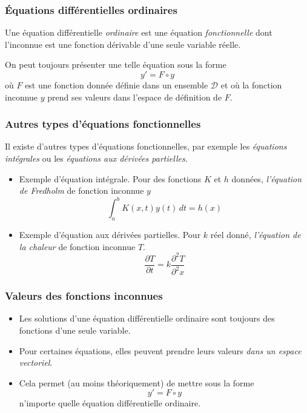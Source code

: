 
\lstset{language=Python,frame=single}

\begin{frame}
  \frametitle{\'Equations différentielles ordinaires}
Une équation différentielle \emph{ordinaire} est une équation \emph{fonctionnelle} dont l'inconnue est une fonction dérivable d'une seule variable réelle.

On peut toujours présenter une telle équation sous la forme
\begin{equation}
  y' = F\circ y
  \label{gene}
\end{equation}
où $F$ est une fonction donnée définie dans un ensemble $\mathcal{D}$ et où la fonction inconnue $y$ prend ses valeurs dans l'espace de définition de $F$.
\end{frame}

\begin{frame}
  \frametitle{Autres types d'équations fonctionnelles}
Il existe d'autres types d'équations fonctionnelles, par exemple les \emph{équations intégrales} ou les \emph{équations aux dérivées partielles}. 
\begin{itemize}
  \item Exemple d'équation intégrale. Pour des fonctions $K$ et $h$ données, \emph{l'équation de Fredholm} de fonction inconnue $y$ 
\begin{equation}
  \int_{a}^{b}K(x,t)y(t)\,dt = h(x)
  \label{fredholm}
\end{equation}
  \item Exemple d'équation aux dérivées partielles. Pour $k$ réel donné, \emph{l'équation de la chaleur} de fonction inconnue $T$.
\begin{displaymath}
  \frac{\partial T}{\partial t} = k\frac{\partial^2 T}{\partial^2 x}
  \label{chaleur}
\end{displaymath}
\end{itemize}
\end{frame}

\begin{frame}
  \frametitle{Valeurs des fonctions inconnues}
\begin{itemize}
  \item Les solutions d'une équation différentielle ordinaire sont toujours des fonctions d'une seule variable.
  \item Pour certaines équations, elles peuvent prendre leurs valeurs \emph{dans un espace vectoriel}.
  \item Cela permet (au moins théoriquement) de mettre sous la forme
\begin{equation*}
  y' = F\circ y
\end{equation*}  
  n'importe quelle équation différentielle ordinaire.
\end{itemize}
\end{frame}

